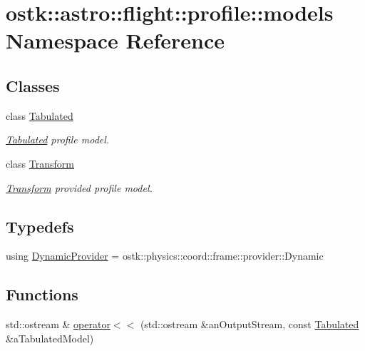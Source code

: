 \hypertarget{namespaceostk_1_1astro_1_1flight_1_1profile_1_1models}{}\section{ostk\+:\+:astro\+:\+:flight\+:\+:profile\+:\+:models Namespace Reference}
\label{namespaceostk_1_1astro_1_1flight_1_1profile_1_1models}
\subsection*{Classes}
\begin{DoxyCompactItemize}
\item 
class \hyperlink{classostk_1_1astro_1_1flight_1_1profile_1_1models_1_1_tabulated}{Tabulated}
\begin{DoxyCompactList}\small\item\em \hyperlink{classostk_1_1astro_1_1flight_1_1profile_1_1models_1_1_tabulated}{Tabulated} profile model. \end{DoxyCompactList}\item 
class \hyperlink{classostk_1_1astro_1_1flight_1_1profile_1_1models_1_1_transform}{Transform}
\begin{DoxyCompactList}\small\item\em \hyperlink{classostk_1_1astro_1_1flight_1_1profile_1_1models_1_1_transform}{Transform} provided profile model. \end{DoxyCompactList}\end{DoxyCompactItemize}
\subsection*{Typedefs}
\begin{DoxyCompactItemize}
\item 
using \hyperlink{namespaceostk_1_1astro_1_1flight_1_1profile_1_1models_a7e9732cb31adb5d5c1f85f7bad1f3424}{Dynamic\+Provider} = ostk\+::physics\+::coord\+::frame\+::provider\+::\+Dynamic
\end{DoxyCompactItemize}
\subsection*{Functions}
\begin{DoxyCompactItemize}
\item 
std\+::ostream \& \hyperlink{namespaceostk_1_1astro_1_1flight_1_1profile_1_1models_a612062c86632f2ac50ed8417a18dc921}{operator$<$$<$} (std\+::ostream \&an\+Output\+Stream, const \hyperlink{classostk_1_1astro_1_1flight_1_1profile_1_1models_1_1_tabulated}{Tabulated} \&a\+Tabulated\+Model)
\end{DoxyCompactItemize}


